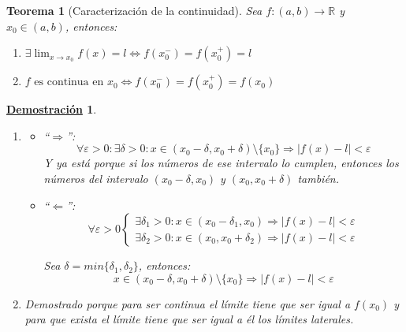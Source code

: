 \documentclass[10pt,a4paper,openright]{book}
\theoremstyle{break}
\newtheorem{theo}{Teorema}[chapter]
\newtheorem*{demo}{\underline{Demostración}}
\begin{document}
\begin{theo}[Caracterización de la continuidad]
Sea $f: (a,b)\longrightarrow \mathbb R$ y $x_0\in (a,b)$, entonces:
\begin{enumerate}
\item $\exists \lim_{x\rightarrow x_0} f(x)=l\Leftrightarrow f(x_0^-)=f(x_0^+)=l$

\item $f \mbox{ es continua en }x_0 \Leftrightarrow f(x_0^-)=f(x_0^+)=f(x_0)$
\end{enumerate}
\end{theo}
\begin{demo}
\begin{enumerate}
\item 
	\begin{itemize}
	\item ``$\Rightarrow $'':
	$$\forall\varepsilon>0: \exists \delta>0: x\in (x_0-\delta, x_0+\delta)\mbox{\textbackslash}\{x_0\}\Rightarrow |f(x)-l|<\varepsilon$$
	Y ya está porque si los números de ese intervalo lo cumplen, entonces los números del intervalo $(x_0-\delta, x_0)$ y $(x_0, x_0+\delta)$ también.
	
	\item ``$\Leftarrow$'':
	$$\forall \varepsilon>0\begin{cases}\exists \delta_1>0: x\in (x_0-\delta_1, x_0)\Rightarrow |f(x)-l|<\varepsilon \\
	\exists \delta_2>0: x\in (x_0,x_0+\delta_2)\Rightarrow |f(x)-l|<\varepsilon\end{cases}$$
	
 	Sea $\delta =min\{ \delta_1, \delta_2\}$, entonces:
	$$x\in (x_0-\delta, x_0+\delta)\mbox{\textbackslash}\{x_0\}\Rightarrow |f(x)-l|<\varepsilon$$
	\end{itemize}
	
\item Demostrado porque para ser continua el límite tiene que ser igual a $f(x_0)$ y para que exista el límite tiene que ser igual a él los límites laterales.
\end{enumerate}
\end{demo}
\end{document}
